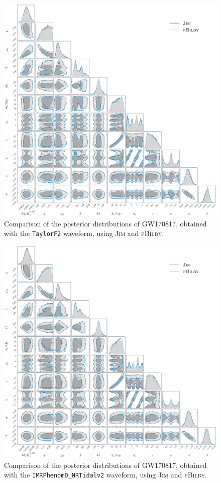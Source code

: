 \documentclass[prd,twocolumn,a4paper,floatfix,nofootinbib,preprintnumbers,superscriptaddress]{revtex4-1}
\begin{document}
\begin{figure}
    \centering
    \includegraphics[width=\textwidth]{GW170817_TaylorF2.pdf}
    \caption{Comparison of the posterior distributions of GW170817, obtained with the \texttt{TaylorF2} waveform, using \textsc{Jim} and \textsc{pBilby}.}
    \label{fig:GW170817_TaylorF2}
\end{figure}

\begin{figure}
    \centering
    \includegraphics[width=\textwidth]{GW170817_NRTidalv2.pdf}
    \caption{Comparison of the posterior distributions of GW170817, obtained with the \texttt{IMRPhenomD\_NRTidalv2} waveform, using \textsc{Jim} and \textsc{pBilby}.}
    \label{fig:GW170817_NRTidalv2}
\end{figure}
\end{document}
